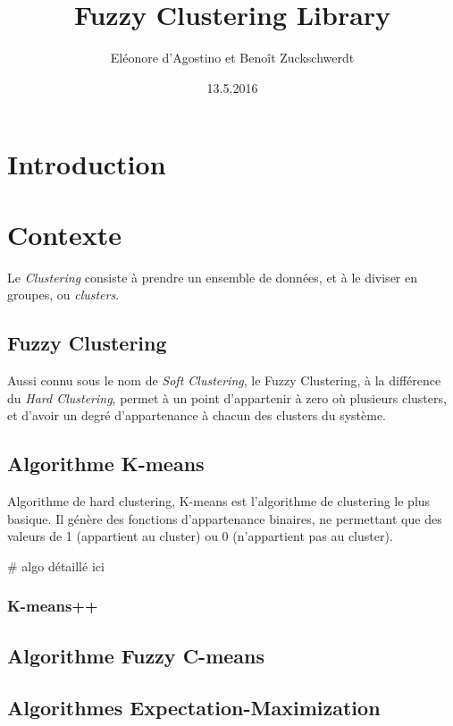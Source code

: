 \documentclass{article}
\title{Fuzzy Clustering Library}
\date{13.5.2016}
\author{Eléonore d'Agostino et Benoît Zuckschwerdt}
\begin{document}
  \maketitle
  \tableofcontents
  \newpage

  \section{Introduction}

  \section{Contexte}

    Le \textit{Clustering} consiste à prendre un ensemble de données, et à le diviser en groupes, ou \textit{clusters}.

    \subsection{Fuzzy Clustering}

      Aussi connu sous le nom de \textit{Soft Clustering}, le Fuzzy Clustering, à la différence du \textit{Hard Clustering}, permet à un point d'appartenir à zero où plusieurs clusters, et d'avoir un degré d'appartenance à chacun des clusters du système.

    \subsection{Algorithme K-means}

      Algorithme de hard clustering, K-means est l'algorithme de clustering le plus basique. Il génère des fonctions d'appartenance binaires, ne permettant que des valeurs de 1 (appartient au cluster) ou 0 (n'appartient pas au cluster).

      \# algo détaillé ici

      \subsubsection{K-means++}

    \subsection{Algorithme Fuzzy C-means}

    \subsection{Algorithmes Expectation-Maximization}
\end{document}
